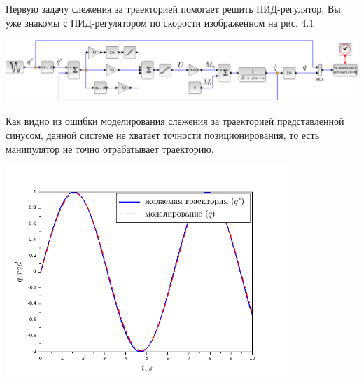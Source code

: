 Первую задачу слежения за траекторией помогает решить ПИД-регулятор. Вы уже знакомы с ПИД-регулятором по скорости изображенном на рис. 4.1\\
\begin{center}
    \includegraphics[width=\textwidth]{Lab4/images/Scheme_without.png}\\
\end{center}
\vspace{1cm}
 Как видно из ошибки моделирования слежения за траекторией представленной синусом, данной системе не хватает точности позиционирования, то есть манипулятор не точно отрабатывает траекторию.\\
 \vspace{1cm}
 \begin{center}
    \includegraphics[width=0.8\textwidth]{Lab4/images/Pict_without.png}\\
\end{center}

